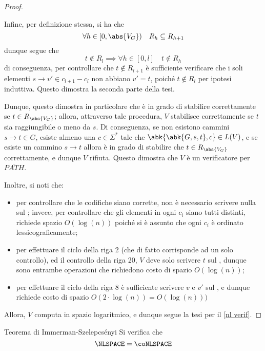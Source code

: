 \documentclass[a4paper, 12pt]{report}
\begin{document}
\begin{proof}
\begin{enumerate}[label=]
                    Infine, per definizione stessa, si ha che $$\forall h \in [0, \abs{V_G}) \quad R_h \subseteq R_{h + 1}$$ dunque segue che $$t \notin R_l \implies \forall h \in [0, l] \quad t \notin R_h$$ di conseguenza, per controllare che $t \notin R_{l + 1}$ è sufficiente verificare che i soli elementi $s \to v' \in c_{l + 1} - c_l$ non abbiano $v' = t$, poiché $t \notin R_l$ per ipotesi induttiva. Questo dimostra la seconda parte della tesi.
            \end{enumerate}

            Dunque, questo dimostra in particolare che  è in grado di stabilire correttamente se $t \in R_{\abs{V_G}}$; allora, attraverso tale procedura, $V$ stabilisce correttamente se $t$ sia raggiungibile o meno da $s$. Di conseguenza, se non esistono cammini $s \to t \in G$, esiste almeno una $c \in \Sigma ^*$ tale che $\abk{\abk{G, s, t}, c} \in L(V)$, e se esiste un cammino $s \to t$ allora  è in grado di stabilire che $t \in R_{\abs{V_G}}$ correttamente, e dunque $V$ rifiuta. Questo dimostra che $V$ è un verificatore per $\overline{PATH}$.

            Inoltre, si noti che:

            \begin{itemize}
                \item per controllare che le codifiche siano corrette, non è necessario scrivere nulla sul ; invece, per controllare che gli elementi in ogni $c_i$ siano tutti distinti, richiede spazio $O(\log(n))$ poiché si è assunto che ogni $c_i$ è ordinato lessicograficamente;
                \item per effettuare il ciclo della riga 2 (che di fatto corrisponde ad un solo controllo), ed il controllo della riga 20, $V$ deve solo scrivere $t$ sul , dunque sono entrambe operazioni che richiedono costo di spazio $O(\log(n))$;
                \item per effettuare il ciclo della riga 8 è sufficiente scrivere $v$ e $v'$ sul , e dunque richiede costo di spazio $O(2 \cdot \log(n)) = O(\log(n)))$
            \end{itemize}

            Allora, $V$ computa in spazio logaritmico, e dunque segue la tesi per il \cref{nl verif}.
    \end{proof}

    \begin{framedthm}[label={immerman}]{Teorema di Immerman-Szelepcsényi}
        Si verifica che $$\NLSPACE = \coNLSPACE$$
    \end{framedthm}
\end{document}
